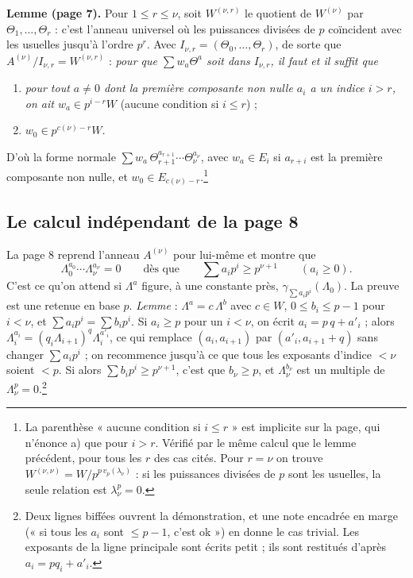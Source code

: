 \documentclass[11pt,a4paper]{article}
\begin{document}
\textbf{Lemme (page 7).} Pour $1 \leqslant r \leqslant \nu$, soit
$W^{(\nu, r)}$ le quotient de $W^{(\nu)}$ par $\Theta_1, \ldots, \Theta_r$ :
c'est l'anneau universel où les puissances divisées de $p$ coïncident avec
les usuelles jusqu'à l'ordre $p^{r}$. Avec $I_{\nu,r} = (\Theta_0, \ldots,
\Theta_r)$, de sorte que $A^{(\nu)}/I_{\nu,r} = W^{(\nu, r)}$ : \emph{pour que
$\sum w_a \Theta^{a}$ soit dans $I_{\nu,r}$, il faut et il suffit que}
\begin{enumerate}
\item[a)] \emph{pour tout $a \neq 0$ dont la première composante non nulle
$a_i$ a un indice $i > r$, on ait $w_a \in p^{i-r}W$} (aucune condition si
$i \leqslant r$) ;
\item[b)] \emph{$w_0 \in p^{c(\nu)-r}W$.}
\end{enumerate}
D'où la forme normale
$\sum w_a\, \Theta_{r+1}^{a_{r+1}}\cdots\Theta_\nu^{a_\nu}$, avec $w_a \in
E_{i}$ si $a_{r+i}$ est la première composante non nulle, et $w_0 \in
E_{c(\nu)-r}$.\footnote{La parenthèse « aucune condition si $i \leqslant r$ »
est implicite sur la page, qui n'énonce a) que pour $i > r$. Vérifié par le
même calcul que le lemme précédent, pour tous les $r$ des cas cités. Pour
$r = \nu$ on trouve $W^{(\nu,\nu)} = W/p^{p\,v_p(\lambda_\nu)}$ : si les
puissances divisées de $p$ sont les usuelles, la seule relation est
$\lambda_\nu^{p} = 0$.}

\subsection*{Le calcul indépendant de la page 8}

La page 8 reprend l'anneau $A^{(\nu)}$ pour lui-même et montre que
\[
\Lambda_0^{a_0}\cdots\Lambda_\nu^{a_\nu} = 0 \qquad \text{dès que} \qquad
\sum a_i p^{i} \geqslant p^{\nu+1} \qquad (a_i \geqslant 0).
\]
C'est ce qu'on attend si $\Lambda^{a}$ figure, à une constante près,
$\gamma_{\sum a_i p^{i}}(\Lambda_0)$. La preuve est une retenue en base $p$.
\emph{Lemme} : $\Lambda^{a} = c\,\Lambda^{b}$ avec $c \in W$,
$0 \leqslant b_i \leqslant p-1$ pour $i < \nu$, et $\sum a_i p^{i} = \sum b_i
p^{i}$. Si $a_i \geqslant p$ pour un $i < \nu$, on écrit $a_i = p\,q + a'_i$ ;
alors $\Lambda_i^{a_i} = (q_i\Lambda_{i+1})^{q}\Lambda_i^{a'_i}$, ce qui
remplace $(a_i, a_{i+1})$ par $(a'_i, a_{i+1} + q)$ sans changer
$\sum a_i p^{i}$ ; on recommence jusqu'à ce que tous les exposants d'indice
$< \nu$ soient $< p$. Si alors $\sum b_i p^{i} \geqslant p^{\nu+1}$, c'est que
$b_\nu \geqslant p$, et $\Lambda_\nu^{b_\nu}$ est un multiple de
$\Lambda_\nu^{p} = 0$.\footnote{Deux lignes biffées ouvrent la démonstration,
et une note encadrée en marge (« si tous les $a_i$ sont $\leqslant p - 1$,
c'est ok ») en donne le cas trivial. Les exposants de la ligne principale
sont écrits petit ; ils sont restitués d'après $a_i = pq_i + a'_i$.}
\end{document}
